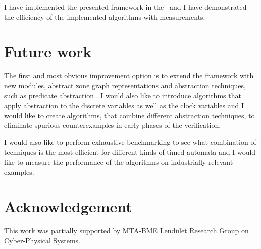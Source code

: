 I have implemented the presented framework in the \ttmcfw\ and I have demonstrated the efficiency of the implemented algorithms with measurements.

\section{Future work}

The first and most obvious improvement option is to extend the framework with new modules, abstract zone graph representations and abstraction techniques, such as predicate abstraction \cite{Graf97a}. I would also like to introduce algorithms that apply abstraction to the discrete variables as well as the clock variables and I would like to create algorithms, that combine different abstraction techniques, to eliminate spurious counterexamples in early phases of the verification.

I would also like to perform exhaustive benchmarking to see what combination of techniques is the most efficient for different kinds of timed automata and I would like to measure the performance of the algorithms on industrially relevant examples.

\section*{Acknowledgement} This work was partially supported by MTA-BME Lendület Research Group on Cyber-Physical Systems.